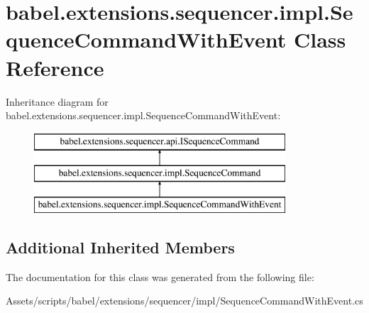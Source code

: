 \hypertarget{classbabel_1_1extensions_1_1sequencer_1_1impl_1_1_sequence_command_with_event}{\section{babel.\-extensions.\-sequencer.\-impl.\-Sequence\-Command\-With\-Event Class Reference}
\label{classbabel_1_1extensions_1_1sequencer_1_1impl_1_1_sequence_command_with_event}
}
Inheritance diagram for babel.\-extensions.\-sequencer.\-impl.\-Sequence\-Command\-With\-Event\-:\begin{figure}[H]
\begin{center}
\leavevmode
\includegraphics[height=3.000000cm]{classbabel_1_1extensions_1_1sequencer_1_1impl_1_1_sequence_command_with_event}
\end{center}
\end{figure}
\subsection*{Additional Inherited Members}


The documentation for this class was generated from the following file\-:\begin{DoxyCompactItemize}
\item 
Assets/scripts/babel/extensions/sequencer/impl/Sequence\-Command\-With\-Event.\-cs\end{DoxyCompactItemize}
